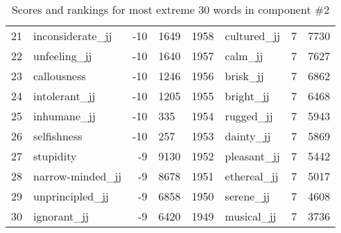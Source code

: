 \begin{table}[tbp]
\begin{tabular}{| rlr@{.}l | rlr@{.}l |}
    21 & inconsiderate\_jj & -10 & 1649    &    1958 & cultured\_jj & 7 & 7730 \\
    22 & unfeeling\_jj & -10 & 1640    &    1957 & calm\_jj & 7 & 7627 \\
    23 & callousness & -10 & 1246    &    1956 & brisk\_jj & 7 & 6862 \\
    24 & intolerant\_jj & -10 & 1205    &    1955 & bright\_jj & 7 & 6468 \\
    25 & inhumane\_jj & -10 & 335    &    1954 & rugged\_jj & 7 & 5943 \\
    26 & selfishness & -10 & 257    &    1953 & dainty\_jj & 7 & 5869 \\
    27 & stupidity & -9 & 9130    &    1952 & pleasant\_jj & 7 & 5442 \\
    28 & narrow-minded\_jj & -9 & 8678    &    1951 & ethereal\_jj & 7 & 5017 \\
    29 & unprincipled\_jj & -9 & 6858    &    1950 & serene\_jj & 7 & 4608 \\
    30 & ignorant\_jj & -9 & 6420    &    1949 & musical\_jj & 7 & 3736 \\
    \hline
    \end{tabular}
    \caption{Scores and rankings for most extreme 30 words in component \#2} 
\end{table}
\clearpage
